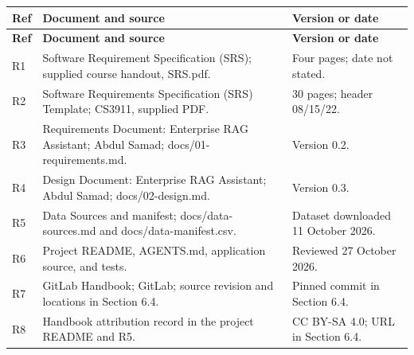 \documentclass[11pt,letterpaper]{article}
\begin{document}
\begin{longtable}{|P{\arrayrulewidth\relax}|P{\arrayrulewidth\relax}|P{\arrayrulewidth\relax}|}

\hline{}

\textbf{Ref} & \textbf{Document and source} & \textbf{Version or date} \\ \hline

\endfirsthead

\hline{}

\textbf{Ref} & \textbf{Document and source} & \textbf{Version or date} \\ \hline

\endhead

\hline\endfoot

\hline\endlastfoot

R1 & Software Requirement Specification (SRS); supplied course handout, SRS.pdf. & Four pages; date not stated. \\ \hline

R2 & Software Requirements Specification (SRS) Template; CS3911, supplied PDF. & 30 pages; header 08/15/22. \\ \hline

R3 & Requirements Document: Enterprise RAG Assistant; Abdul Samad; docs/01-requirements.md. & Version 0.2. \\ \hline

R4 & Design Document: Enterprise RAG Assistant; Abdul Samad; docs/02-design.md. & Version 0.3. \\ \hline

R5 & Data Sources and manifest; docs/data-sources.md and docs/data-manifest.csv. & Dataset downloaded 11 October 2026. \\ \hline

R6 & Project README, AGENTS.md, application source, and tests. & Reviewed 27 October 2026. \\ \hline

R7 & GitLab Handbook; GitLab; source revision and locations in Section 6.4. & Pinned commit in Section 6.4. \\ \hline

R8 & Handbook attribution record in the project README and R5. & CC BY-SA 4.0; URL in Section 6.4. \\ \hline

\end{longtable}
\end{document}
